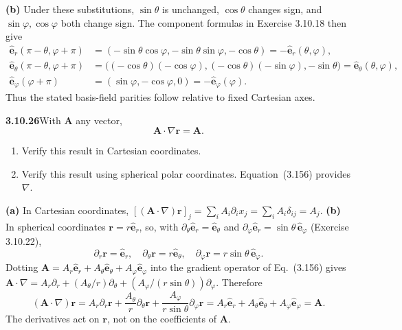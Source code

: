\textbf{(b)} Under these substitutions,
$\sin\theta$ is unchanged, $\cos\theta$ changes sign, and
$\sin\varphi,\cos\varphi$ both change sign.
The component formulas in Exercise 3.10.18 then give
\[
\begin{aligned}
\hat{\mathbf e}_r(\pi-\theta,\varphi+\pi)
&=(-\sin\theta\cos\varphi,-\sin\theta\sin\varphi,-\cos\theta)
=-\hat{\mathbf e}_r(\theta,\varphi),\\
\hat{\mathbf e}_\theta(\pi-\theta,\varphi+\pi)
&=\bigl((-\cos\theta)(-\cos\varphi),(-\cos\theta)(-\sin\varphi),-\sin\theta\bigr)
=\hat{\mathbf e}_\theta(\theta,\varphi),\\
\hat{\mathbf e}_\varphi(\varphi+\pi)
&=(\sin\varphi,-\cos\varphi,0)=-\hat{\mathbf e}_\varphi(\varphi).
\end{aligned}
\]
Thus the stated basis-field parities follow relative to fixed Cartesian axes.

\par\bigskip
\noindent\textbf{3.10.26}\quad With $\mathbf{A}$ any vector,
\[
\mathbf{A}\cdot\nabla\mathbf{r}=\mathbf{A}.
\]
\begin{enumerate}
\item[(a)] Verify this result in Cartesian coordinates.
\item[(b)] Verify this result using spherical polar coordinates.
  Equation~(3.156) provides $\nabla$.
\end{enumerate}
\solution
\textbf{(a)} In Cartesian coordinates,
$[(\mathbf A\cdot\nabla)\mathbf r]_j
=\sum_i A_i\partial_i x_j=\sum_iA_i\delta_{ij}=A_j$.
\textbf{(b)} In spherical coordinates $\mathbf r=r\hat{\mathbf e}_r$,
so, with $\partial_\theta\hat{\mathbf e}_r=\hat{\mathbf e}_\theta$ and
$\partial_\varphi\hat{\mathbf e}_r=\sin\theta\,\hat{\mathbf e}_\varphi$
(Exercise 3.10.22),
\[
\partial_r\mathbf r=\hat{\mathbf e}_r,\quad
\partial_\theta\mathbf r=r\hat{\mathbf e}_\theta,\quad
\partial_\varphi\mathbf r=r\sin\theta\,\hat{\mathbf e}_\varphi.
\]
Dotting $\mathbf A=A_r\hat{\mathbf e}_r+A_\theta\hat{\mathbf e}_\theta
+A_\varphi\hat{\mathbf e}_\varphi$ into the gradient operator of
Eq.~(3.156) gives
$\mathbf A\cdot\nabla=A_r\partial_r+(A_\theta/r)\partial_\theta
+(A_\varphi/(r\sin\theta))\partial_\varphi$. Therefore
\[
(\mathbf A\cdot\nabla)\mathbf r
=A_r\partial_r\mathbf r+\frac{A_\theta}{r}\partial_\theta\mathbf r
+\frac{A_\varphi}{r\sin\theta}\partial_\varphi\mathbf r
=A_r\hat{\mathbf e}_r+A_\theta\hat{\mathbf e}_\theta
+A_\varphi\hat{\mathbf e}_\varphi
=\boxed{\mathbf A}.
\]
The derivatives act on $\mathbf r$, not on the coefficients of $\mathbf A$.

